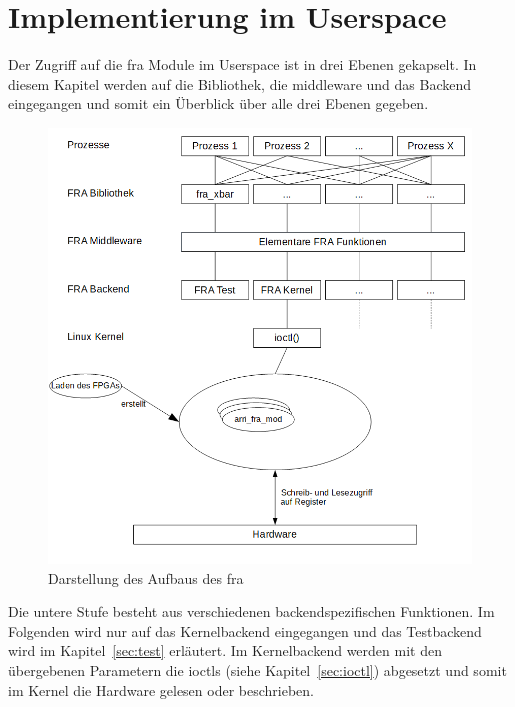 \section{Implementierung im Userspace}\label{sec:user}
Der Zugriff auf die \ac{fra} Module im Userspace ist in drei Ebenen gekapselt. In diesem Kapitel werden auf die Bibliothek, die \gls{middleware} und das Backend eingegangen und somit ein Überblick über alle drei Ebenen gegeben.


\begin{figure}[!hbtp]
	\centering
	\includegraphics[width = \linewidth]{pictures/2019-11-17_FRA_Overview.png}
	\smallskip
	\caption{Darstellung des Aufbaus des \ac{fra}}
	\label{fig:overview}
\end{figure} 

Die untere Stufe besteht aus verschiedenen backendspezifischen Funktionen. Im Folgenden wird nur auf das Kernelbackend eingegangen und das Testbackend wird im Kapitel~\ref{sec:test} erläutert. Im Kernelbackend werden mit den übergebenen Parametern die \ac{ioctl}s (siehe Kapitel~\ref{sec:ioctl}) abgesetzt und somit im Kernel die Hardware gelesen oder beschrieben.

